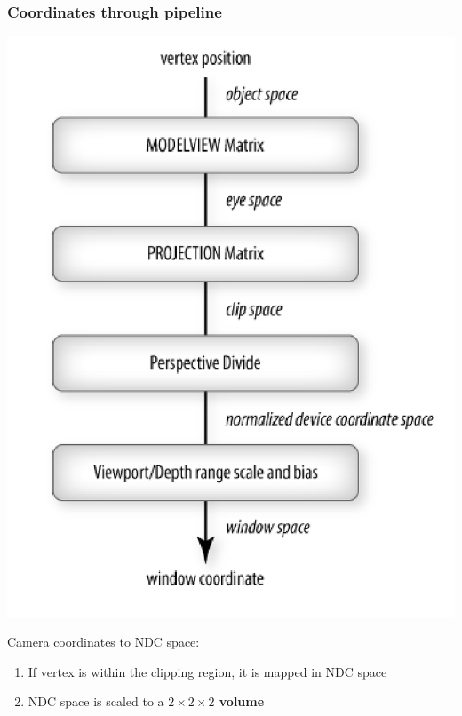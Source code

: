 \documentclass{beamer}
\begin{document}
\begin{frame}
    \frametitle{Coordinates through pipeline}

    \begin{center}
        \includegraphics[scale=0.3]{coordinate_pipeline.png}
    \end{center}

    Camera coordinates to NDC space: 
    \begin{enumerate}
        \item If vertex is within the clipping region, it is mapped in NDC space
        \item NDC space is scaled to a \textbf{$2 \times 2 \times 2$ volume}
    \end{enumerate}

\end{frame}
\end{document}
